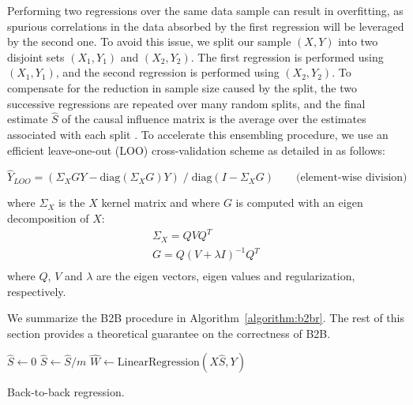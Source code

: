 \documentclass[preprint,12pt,3p]{elsarticle}
\begin{document}
Performing two regressions over the same data sample can result in overfitting,
as spurious correlations in the data absorbed by the first regression will be
leveraged by the second one.
%
To avoid this issue, we split our sample $(X, Y)$ into two disjoint sets $(X_1, Y_1)$
and $(X_2, Y_2)$.
%
The first regression is performed using $(X_1, Y_1)$, and the second
regression is performed using $(X_2, Y_2)$.
%
To compensate for the reduction in sample size caused by the split, the two
successive regressions are
repeated over many random splits, and the final estimate $\hat S$ of the causal
influence matrix is the average over the estimates associated with each split
\citep{breiman1996bagging}.
%
To accelerate this ensembling procedure, we use an efficient
leave-one-out (LOO) cross-validation scheme as detailed in \citep{rifkin2007notes}
as follows:
%

\begin{equation}
\hat{Y}_{LOO} = (\Sigma_X G Y - \text{diag}(\Sigma_X G) Y) \;/\; \text{diag}(I - \Sigma_X G) \qquad \text{(element-wise division)}
\end{equation}

where $\Sigma_X$ is the $X$ kernel matrix and where $G$ is computed with an
eigen decomposition of $X$:
\begin{equation}
  \begin{aligned}
  \Sigma_X = Q V Q^T \\
  G = Q (V + \lambda I)^{-1} Q^T\\
  \end{aligned}
\end{equation}
where $Q$, $V$ and $\lambda$ are the eigen vectors, eigen values and
regularization, respectively.

We summarize the B2B procedure in Algorithm~\ref{algorithm:b2br}.
%
The rest of this section provides a theoretical guarantee on the correctness of
B2B.


\begin{algorithm}[H]
    $\hat{S} \leftarrow 0$\;
    $\hat{S} \leftarrow \hat{S} / m$\;
    $\hat{W} \leftarrow \text{LinearRegression}(X \hat{S}, Y)$\;
    \caption{Back-to-back regression.}
    \label{algorithm:b2br}
\end{algorithm}
\end{document}
